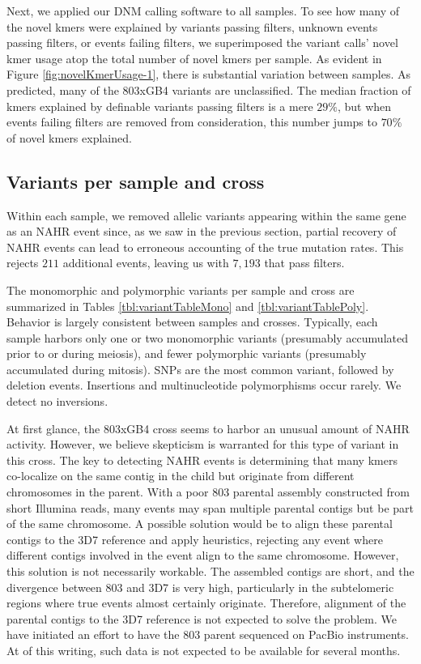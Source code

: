 Next, we applied our DNM calling software to all samples.  To see how many of the novel kmers were explained by variants passing filters, unknown events passing filters, or events failing filters, we superimposed the variant calls' novel kmer usage atop the total number of novel kmers per sample.  As evident in Figure \ref{fig:novelKmerUsage-1}, there is substantial variation between samples.  As predicted, many of the 803xGB4 variants are unclassified.  The median fraction of kmers explained by definable variants passing filters is a mere $29\%$, but when events failing filters are removed from consideration, this number jumps to $70\%$ of novel kmers explained.

\subsection{Variants per sample and cross}

Within each sample, we removed allelic variants appearing within the same gene as an NAHR event since, as we saw in the previous section, partial recovery of NAHR events can lead to erroneous accounting of the true mutation rates.  This rejects $211$ additional events, leaving us with $7,193$ that pass filters.

The monomorphic and polymorphic variants per sample and cross are summarized in Tables \ref{tbl:variantTableMono} and \ref{tbl:variantTablePoly}.  Behavior is largely consistent between samples and crosses.  Typically, each sample harbors only one or two monomorphic variants (presumably accumulated prior to or during meiosis), and fewer polymorphic variants (presumably accumulated during mitosis).  SNPs are the most common variant, followed by deletion events.  Insertions and multinucleotide polymorphisms occur rarely.  We detect no inversions.

At first glance, the 803xGB4 cross seems to harbor an unusual amount of NAHR activity.  However, we believe skepticism is warranted for this type of variant in this cross.  The key to detecting NAHR events is determining that many kmers co-localize on the same contig in the child but originate from different chromosomes in the parent.  With a poor 803 parental assembly constructed from short Illumina reads, many events may span multiple parental contigs but be part of the same chromosome.  A possible solution would be to align these parental contigs to the 3D7 reference and apply heuristics, rejecting any event where different contigs involved in the event align to the same chromosome.  However, this solution is not necessarily workable.  The assembled contigs are short, and the divergence between 803 and 3D7 is very high, particularly in the subtelomeric regions where true events almost certainly originate.  Therefore, alignment of the parental contigs to the 3D7 reference is not expected to solve the problem.  We have initiated an effort to have the 803 parent sequenced on PacBio instruments.  At of this writing, such data is not expected to be available for several months.

